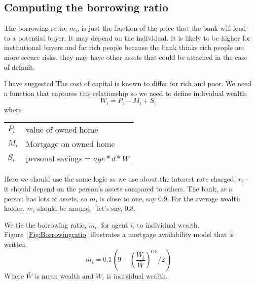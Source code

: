 \subsection{Computing the borrowing ratio}
The borrowing ratio, $m_i$, is just the fraction of the price that the bank will lend to a potential buyer. It may depend on the individual. It is likely to be higher for institutional buyers  and for rich people because the bank thinks rich people are more secure risks. they may have other assets that could be attached in the case of default.

I have suggested The cost of capital is known to differ for rich and poor. We need a function that captures this relationship so we need to define individual wealth:
\[W_i= P_i -M_i  +S_i\]
where 

\begin{tabular}{ll}
$P_i$ & value of owned home\\
$M_i$ & Mortgage on owned home\\
$S_i$ & personal savings = $age*d*W$\\
\end{tabular}

Here we should use the same logic as we use about the interest rate charged, $r_i$ - it should depend on the person's assets compared to others. The bank, as a person has lots of assets, so $m_i$ is close to one, say 0.9. For the average wealth holder, $m_i$ should be around - let's say, 0.8. 

We  tie the borrowing ratio, $m_i$,  for agent $i$, to individual wealth. Figure~\ref{Fig:Borrowingratio} illustrates a mortgage availability  model that is written 
 \[ m_i = 0.1(9-\left(\frac{W_i}{\bar W}\right)^{0.5}/2 )\]
Where $\bar{W}$ is mean wealth and $W_i$ is individual wealth. 

